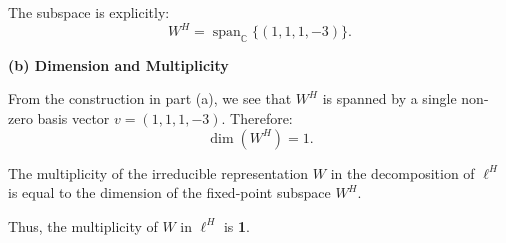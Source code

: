 \documentclass{article}
\begin{document}
The subspace is explicitly:
\[ W^H = \operatorname{span}_{\mathbb{C}} \{ (1, 1, 1, -3) \}. \]

\vspace{1em}
\textbf{(b) Dimension and Multiplicity}

From the construction in part (a), we see that $W^H$ is spanned by a single non-zero basis vector $v = (1, 1, 1, -3)$.
Therefore:
\[ \dim(W^H) = 1. \]

The multiplicity of the irreducible representation $W$ in the decomposition of $\ell^H$ is equal to the dimension of the fixed-point subspace $W^H$.

Thus, the multiplicity of $W$ in $\ell^H$ is \textbf{1}.


\end{document}
